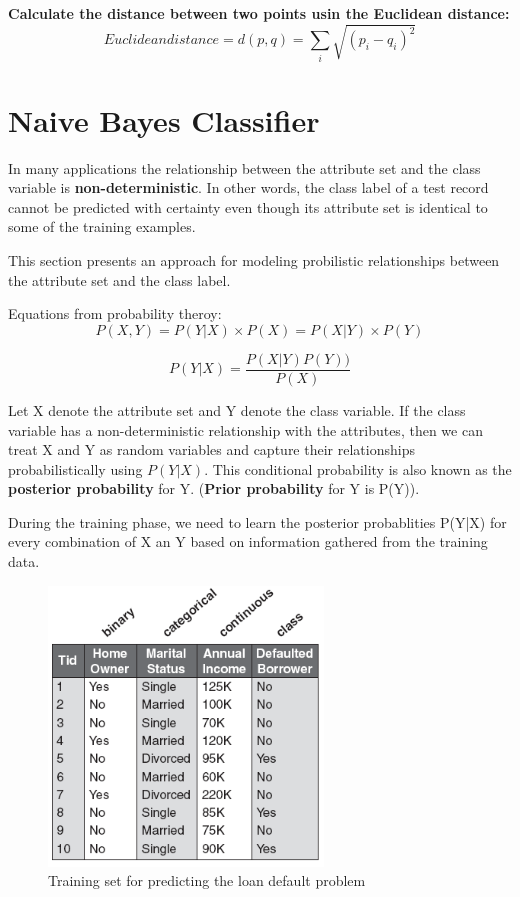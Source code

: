 		{\bf Calculate the distance between two points usin the Euclidean distance:}
		\begin{equation}
			Euclidean distance = d(p,q) = \sum_{i}^{} \sqrt{(p_{i} - q_{i})^{2}}
		\end{equation}

		\clearpage
	\section{Naive Bayes Classifier}

		In many applications the relationship between the attribute set and the class
		variable is {\bf non-deterministic}. In other words, the class label of a test
		record cannot be predicted with certainty even though its attribute set is 
		identical to some of the training examples. 

		This section presents an approach for modeling probilistic relationships
		between the attribute set and the class label. 

		Equations from probability theroy:
		\begin{equation}
			P(X,Y) = P(Y|X) \times P(X) = P(X|Y) \times P(Y)
		\end{equation}

		\begin{equation}
			P(Y|X) = \frac{P(X|Y)P(Y))}{P(X)}
		\end{equation}

		Let X denote the attribute set and Y denote the class variable. If the class variable
		has a non-deterministic relationship with the attributes, then we can treat X and Y
		as random variables and capture their relationships probabilistically using $P(Y|X)$.
		This conditional probability is also known as the {\bf posterior probability} for Y. 
		({\bf Prior probability} for Y is P(Y)).

		During the training phase, we need to learn the posterior probablities P(Y|X) for every
		combination of X an Y based on information gathered from the training data. 

		\begin{figure}[H]
			\centering
			\includegraphics[scale=0.55]{pics/bayesian.png}
			\caption{Training set for predicting the loan default problem}
		\end{figure}

